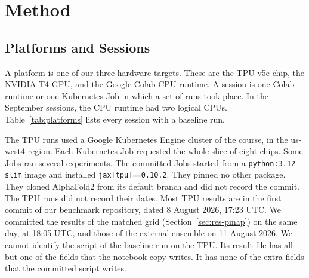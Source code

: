 \section{Method}\label{sec:method}

\subsection{Platforms and Sessions}\label{sec:platforms}
\begin{table}[t]
\caption{\capTabPlatforms}\label{tab:platforms}
\centering\small{}
\end{table}

A platform is one of our three hardware targets. These are the TPU v5e chip, the NVIDIA T4 GPU, and the Google Colab
CPU runtime. A session is one Colab runtime or one Kubernetes Job in which a set of runs took place.
In the September sessions, the CPU runtime had two logical CPUs. %
Table~\ref{tab:platforms} lists every session with a baseline run.

The TPU runs used a Google Kubernetes Engine cluster of the course, in the us-west4 region. Each Kubernetes Job
requested the whole slice of eight chips. Some Jobs ran several experiments.
The committed Jobs started from a \texttt{python:3.12-slim} image and installed \texttt{jax[tpu]==0.10.2}. %
They pinned no other package. They cloned AlphaFold2 from its default branch and did not record the commit. The TPU
runs did not record their dates.
Most TPU results are in the first commit of our benchmark repository, dated 8 August 2026, 17:23 UTC. %
We committed the results of the matched grid (Section~\ref{sec:res-pmap}) on the same day, at 18:05 UTC, and those of the external ensemble on 11 August 2026. %
We cannot identify the script of the baseline run on the TPU. Its result file has all but one of the fields that the
notebook copy writes. It has none of the extra fields that the committed script writes. %

